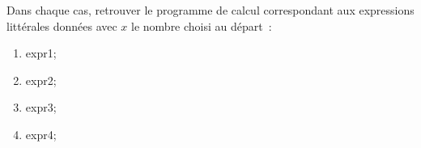 \documentclass[exercice]{thedocument}%
\begin{document}
%
Dans chaque cas, retrouver le programme de calcul correspondant aux expressions
littérales données avec $x$ le nombre choisi au départ~:
\begin{enumerate}
    \item \<expr1;
    \item \<expr2;
    \item \<expr3;
    \item \<expr4;
\end{enumerate}
\end{document}
